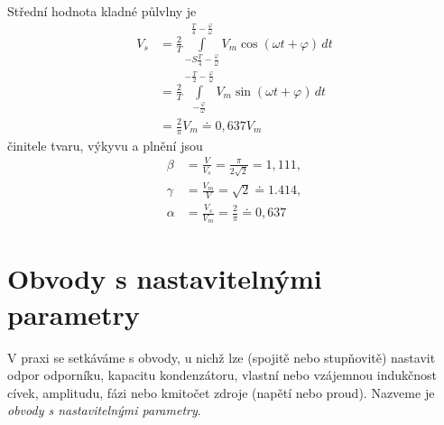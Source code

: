 \begin{example}
      Střední hodnota kladné půlvlny je 
      \begin{align*}
        V_s &= \frac{2}{T}\int\limits_{-S\frac{T}{4}-
               \frac{\varphi}{\omega}}^{\frac{T}{4}-
               \frac{\varphi}{\omega}}{V_m\cos(\omega t +\varphi)}\,dt                            \\
            &= \frac{2}{T}\int\limits_{-\frac{\varphi}{\omega}}^{-\frac{T}{2}-
               \frac{\varphi}{\omega}}{V_m\sin(\omega t +\varphi)}\,dt                            \\
            &= \frac{2}{\pi}V_m \doteq 0,637V_m
      \end{align*}
      činitele tvaru, výkyvu a plnění jsou 
      \begin{align*}
        \beta  &=\frac{V}{V_s}   =\frac{\pi}{2\sqrt{2}}=1,111, \\ 
        \gamma &=\frac{V_m}{V}   =\sqrt{2}\doteq1.414,         \\
        \alpha &=\frac{V_s}{V_m} =\frac{2}{\pi}\doteq0,637 
      \end{align*}
    \end{example}
      
  \section{Obvody s nastavitelnými parametry}
    V praxi se setkáváme s obvody, u nichž lze (spojitě nebo stupňovitě) nastavit odpor odporníku, 
    kapacitu kondenzátoru, vlastní nebo vzájemnou indukčnost cívek, amplitudu, fázi nebo kmitočet
    zdroje (napětí nebo proud). Nazveme je \emph{obvody s nastavitelnými parametry}.
    
\printbibliography[heading=subbibliography]